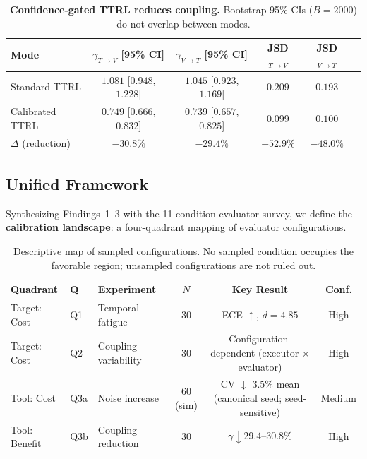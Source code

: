 \documentclass[11pt]{article}
\begin{document}
\begin{table}[H]
\centering
\caption{\textbf{Confidence-gated TTRL reduces coupling.} Bootstrap 95\% CIs ($B{=}2000$) do not overlap between modes.}
\label{tab:coupling}
\begin{tabular}{@{}lccccc@{}}
\toprule
Mode & $\bar{\gamma}_{T \to V}$ [95\% CI] & $\bar{\gamma}_{V \to T}$ [95\% CI] & JSD$_{T \to V}$ & JSD$_{V \to T}$ \\
\midrule
Standard TTRL & $1.081$ [$0.948$, $1.228$] & $1.045$ [$0.923$, $1.169$] & $0.209$ & $0.193$ \\
Calibrated TTRL & $0.749$ [$0.666$, $0.832$] & $0.739$ [$0.657$, $0.825$] & $0.099$ & $0.100$ \\
\midrule
$\Delta$ (reduction) & $-30.8\%$ & $-29.4\%$ & $-52.9\%$ & $-48.0\%$ \\
\bottomrule
\end{tabular}
\end{table}


\subsection{Unified Framework}

Synthesizing Findings~1--3 with the 11-condition evaluator survey, we define the \textbf{calibration landscape}: a four-quadrant mapping of evaluator configurations.

\begin{table}[H]
\centering
\caption{Descriptive map of sampled configurations. No sampled condition occupies the favorable region; unsampled configurations are not ruled out.}
\begin{tabular}{@{}lllccc@{}}
\toprule
Quadrant & Q & Experiment & $N$ & Key Result & Conf. \\
\midrule
Target: Cost & Q1 & Temporal fatigue & 30 & ECE $\uparrow$, $d{=}4.85$ & High \\
Target: Cost & Q2 & Coupling variability & 30 & Configuration-dependent (executor $\times$ evaluator) & High \\
Tool: Cost & Q3a & Noise increase & 60 (sim) & CV $\downarrow$ 3.5\% mean (canonical seed; seed-sensitive) & Medium \\
Tool: Benefit & Q3b & Coupling reduction & 30 & $\gamma \downarrow 29.4$--$30.8\%$ & High \\
\bottomrule
\end{tabular}
\end{table}
\end{document}
